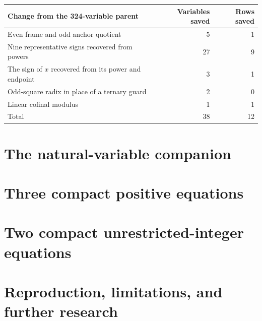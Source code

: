 \documentclass[11pt]{article}
\theoremstyle{remark}\newtheorem{remark}[theorem]{Remark}
\begin{document}
\begin{center}\small
\begin{tabular}{lrr}
\toprule
Change from the 324-variable parent&Variables saved&Rows saved\\
\midrule
Even frame and odd anchor quotient&5&1\\
Nine representative signs recovered from powers&27&9\\
The sign of $x$ recovered from its power and endpoint&3&1\\
Odd-square radix in place of a ternary guard&2&0\\
Linear cofinal modulus&1&1\\
\midrule
Total&38&12\\
\bottomrule
\end{tabular}
\end{center}

\section{The natural-variable companion}\label{sec:natural}


\section{Three compact positive equations}\label{sec:compact}


\section{Two compact unrestricted-integer equations}\label{sec:signed}


\section{Reproduction, limitations, and further research}\label{sec:reproduce}

\end{document}
